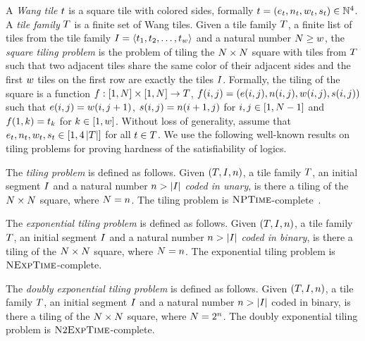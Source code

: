 A \emph{Wang tile} $t$ is a square tile with colored sides,
formally 
$t = (e_{t}, n_{t}, w_{t}, s_{t}) \in \mathbb{N}^4$.
A \emph{tile family} $T$ is a finite set of Wang tiles.
Given a tile family $T$, a finite list of tiles from the tile family
$I = \left\langle t_{1}, t_{2}, \dots, t_{w} \right\rangle$ and a natural number 
$N \geq w$, the \emph{square tiling problem} is the problem of tiling the
$N \times N$ square with tiles from $T$ such that two adjacent
tiles share the same color of their adjacent sides and the first $w$ tiles on
the first row are exactly the tiles $I$.
Formally, the tiling of the square is a function
$f : [1, N] \times [1, N] \to T$,
$f(i,j) = 
(e(i, j), n(i, j), w(i, j), s(i, j))$ such that
$e(i, j) = w(i, j+1)$, 
$s(i, j) = n(i+1,j)$ for $i, j \in [1, N-1]$
and $f(1, k) = t_{k}$ for $k \in [1, w]$.
Without loss of generality, assume that
$e_{t}, n_{t}, w_{t}, s_{t} \in [1,4\left|T\right|]$ for all
$t \in T$.
We use the following well-known results on tiling problems for proving hardness
of the satisfiability of logics.

The \emph{tiling problem} is defined as follows. Given $(T, I, n)$,
a tile family $T$, an initial segment $I$ and a natural number $n >
\left|I\right|$ \emph{coded in unary}, is there a tiling of the $N \times
N$ square, where $N = n$.
The tiling problem is $\text{\normalfont{\scshape NPTime}}$-complete~\cite{van1997convenience}.

The \emph{exponential tiling problem} is defined as follows. 
Given $(T, I, n)$, a tile family $T$, an initial segment
$I$ and a natural number $n > \left|I\right|$ \emph{coded in binary}, is
there a tiling of the $N \times N$ square, where $N = n$.
The exponential tiling problem is $\text{\normalfont{\scshape NExpTime}}$-complete.

The \emph{doubly exponential tiling problem} is defined as follows.
Given $(T, I, n)$, a tile family $T$, an initial segment
$I$ and a natural number $n > \left|I\right|$ coded in binary, is
there a tiling of the $N \times N$ square, where $N = 2^n$.
The doubly exponential tiling problem is $\text{\normalfont{\scshape N}}2\text{\normalfont{\scshape ExpTime}}$-complete.